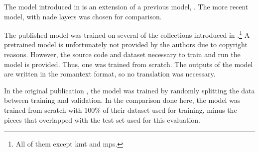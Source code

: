 
The model introduced in \textcite{micchi2021deep} is an
extension of a previous model, \textcite{micchi2020not}. The
more recent model, with \gls{nade} layers was chosen for
comparison.

The published model was trained on several of the
collections introduced in
.\footnote{All of
them except \gls{kmt} and \gls{mps}.} A pretrained model is
unfortunately not provided by the authors due to copyright
reasons. However, the source code and dataset necessary to
train and run the model is provided. Thus, one was trained
from scratch. The outputs of the model are written in the
\gls{romantext} format, so no translation was necessary. 

In the original publication \parencite{micchi2021deep}, the
model was trained by randomly splitting the data between
training and validation. In the comparison done here, the
model was trained from scratch with 100\% of their dataset
used for training, minus the pieces that overlapped with the
test set used for this evaluation.
